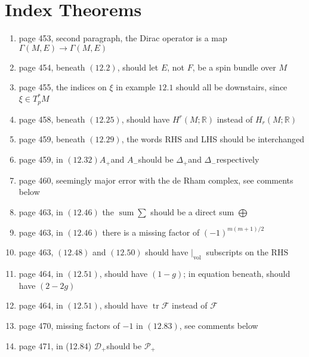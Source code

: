 \documentclass{article}
\begin{document}
\section*{Index Theorems}
\begin{enumerate}
  
\item page 453, second paragraph, the Dirac operator is a map $\Gamma(M, E) \rightarrow \Gamma(M, E)$

\item page 454, beneath $(12.2)$, should let $E$, not $F$, be a spin bundle over $M$

\item page 455, the indices on $\xi$ in example $12.1$ should all be downstairs, since $\xi \in T_{p}^{*} M$

\item page 458, beneath $(12.25)$, should have $H^{r}(M ; \mathbb{R})$ instead of $H_{r}(M ; \mathbb{R})$

\item page 459, beneath $(12.29)$, the words $\mathrm{RHS}$ and LHS should be interchanged

\item page 459, in $(12.32) A_{+}$and $A_{-}$should be $\Delta_{+}$and $\Delta_{-}$respectively

\item page 460, seemingly major error with the de Rham complex, see comments below

\item page 463, in $(12.46)$ the $\operatorname{sum} \sum$ should be a direct sum $\bigoplus$

\item page 463, in $(12.46)$ there is a missing factor of $(-1)^{m(m+1) / 2}$

\item page 463, $(12.48)$ and $(12.50)$ should have $\left.\right|_{\text {vol }}$ subscripts on the $\mathrm{RHS}$

\item page 464, in $(12.51)$, should have $(1-g)$; in equation beneath, should have $(2-2 g)$

\item page 464, in $(12.51)$, should have $\operatorname{tr} \mathcal{F}$ instead of $\mathcal{F}$

\item page 470, missing factors of $-1$ in $(12.83)$, see comments below

\item page 471, in (12.84) $\mathcal{D}_{+}$should be $\mathcal{P}_{+}$


\end{enumerate}
\end{document}
